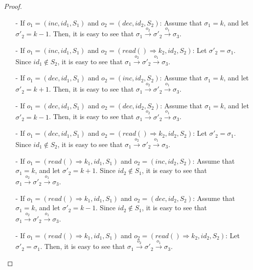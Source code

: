 {\begin {proof}
\begin{itemize}
\item[-] If $o_1 = (\mathit{inc},\mathit{id}_1,S_1)$ and $o_2 = (\mathit{dec},\mathit{id}_2,S_2)$: Assume that $\sigma_1 = k$, and let $\sigma'_2 = \mathit{k-1}$. Then, it is easy to see that $\sigma_1 {\xrightarrow{o_2}} \sigma'_2 {\xrightarrow{o_1}} \sigma_3$.

\item[-] If $o_1 = (\mathit{inc},\mathit{id}_1,S_1)$ and $o_2 = (\mathit{read}() \Rightarrow k_2,\mathit{id}_2,S_2)$: Let $\sigma'_2 = \sigma_1$. Since $\mathit{id}_1 \notin S_2$, it is easy to see that $\sigma_1 {\xrightarrow{o_2}} \sigma'_2 {\xrightarrow{o_1}} \sigma_3$.

\item[-] If $o_1 = (\mathit{dec},\mathit{id}_1,S_1)$ and $o_2 = (\mathit{inc},\mathit{id}_2,S_2)$: Assume that $\sigma_1 = k$, and let $\sigma'_2 = \mathit{k+1}$. Then, it is easy to see that $\sigma_1 {\xrightarrow{o_2}} \sigma'_2 {\xrightarrow{o_1}} \sigma_3$.

\item[-] If $o_1 = (\mathit{dec},\mathit{id}_1,S_1)$ and $o_2 = (\mathit{dec},\mathit{id}_2,S_2)$: Assume that $\sigma_1 = k$, and let $\sigma'_2 = \mathit{k-1}$. Then, it is easy to see that $\sigma_1 {\xrightarrow{o_2}} \sigma'_2 {\xrightarrow{o_1}} \sigma_3$.

\item[-] If $o_1 = (\mathit{dec},\mathit{id}_1,S_1)$ and $o_2 = (\mathit{read}() \Rightarrow k_2,\mathit{id}_2,S_2)$: Let $\sigma'_2 = \sigma_1$. Since $\mathit{id}_1 \notin S_2$, it is easy to see that $\sigma_1 {\xrightarrow{o_2}} \sigma'_2 {\xrightarrow{o_1}} \sigma_3$.

\item[-] If $o_1 = (\mathit{read}() \Rightarrow k_1,\mathit{id}_1,S_1)$ and $o_2 = (\mathit{inc},\mathit{id}_2,S_2)$: Assume that $\sigma_1 = k$, and let $\sigma'_2 = \mathit{k+1}$. Since $\mathit{id}_2 \notin S_1$, it is easy to see that $\sigma_1 {\xrightarrow{o_2}} \sigma'_2 {\xrightarrow{o_1}} \sigma_3$.

\item[-] If $o_1 = (\mathit{read}() \Rightarrow k_1,\mathit{id}_1,S_1)$ and $o_2 = (\mathit{dec},\mathit{id}_2,S_2)$: Assume that $\sigma_1 = k$, and let $\sigma'_2 = \mathit{k-1}$. Since $\mathit{id}_2 \notin S_1$, it is easy to see that $\sigma_1 {\xrightarrow{o_2}} \sigma'_2 {\xrightarrow{o_1}} \sigma_3$.

\item[-] If $o_1 = (\mathit{read}() \Rightarrow k_1,\mathit{id}_1,S_1)$ and $o_2 = (\mathit{read}() \Rightarrow k_2,\mathit{id}_2,S_2)$: Let $\sigma'_2 = \sigma_1$. Then, it is easy to see that $\sigma_1 {\xrightarrow{o_2}} \sigma'_2 {\xrightarrow{o_1}} \sigma_3$.
\end{itemize}


\end{proof}}
